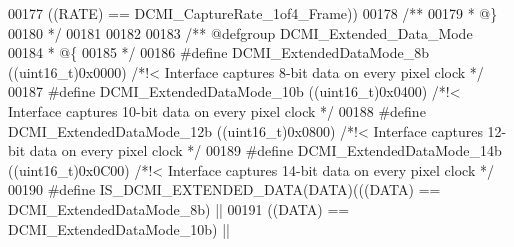 \begin{DoxyCode}
00177                                     \textcolor{preprocessor}{(}\textcolor{preprocessor}{(}\textcolor{preprocessor}{RATE}\textcolor{preprocessor}{)} \textcolor{preprocessor}{==} DCMI_CaptureRate_1of4_Frame\textcolor{preprocessor}{)}\textcolor{preprocessor}{)}
00178 \textcolor{comment}{/**}
00179 \textcolor{comment}{  * @\}}
00180 \textcolor{comment}{  */}
00181 
00182 
00183 \textcolor{comment}{/** @defgroup DCMI\_Extended\_Data\_Mode }
00184 \textcolor{comment}{  * @\{}
00185 \textcolor{comment}{  */}
00186 \textcolor{preprocessor}{#}\textcolor{preprocessor}{define} \textcolor{preprocessor}{DCMI\_ExtendedDataMode\_8b}     \textcolor{preprocessor}{(}\textcolor{preprocessor}{(}\textcolor{preprocessor}{uint16\_t}\textcolor{preprocessor}{)}0x0000\textcolor{preprocessor}{)} \textcolor{comment}{/*!< Interface captures 8-bit data on every
       pixel clock */}
00187 \textcolor{preprocessor}{#}\textcolor{preprocessor}{define} \textcolor{preprocessor}{DCMI\_ExtendedDataMode\_10b}    \textcolor{preprocessor}{(}\textcolor{preprocessor}{(}\textcolor{preprocessor}{uint16\_t}\textcolor{preprocessor}{)}0x0400\textcolor{preprocessor}{)} \textcolor{comment}{/*!< Interface captures 10-bit data on every
       pixel clock */}
00188 \textcolor{preprocessor}{#}\textcolor{preprocessor}{define} \textcolor{preprocessor}{DCMI\_ExtendedDataMode\_12b}    \textcolor{preprocessor}{(}\textcolor{preprocessor}{(}\textcolor{preprocessor}{uint16\_t}\textcolor{preprocessor}{)}0x0800\textcolor{preprocessor}{)} \textcolor{comment}{/*!< Interface captures 12-bit data on every
       pixel clock */}
00189 \textcolor{preprocessor}{#}\textcolor{preprocessor}{define} \textcolor{preprocessor}{DCMI\_ExtendedDataMode\_14b}    \textcolor{preprocessor}{(}\textcolor{preprocessor}{(}\textcolor{preprocessor}{uint16\_t}\textcolor{preprocessor}{)}0x0C00\textcolor{preprocessor}{)} \textcolor{comment}{/*!< Interface captures 14-bit data on every
       pixel clock */}
00190 \textcolor{preprocessor}{#}\textcolor{preprocessor}{define} \textcolor{preprocessor}{IS\_DCMI\_EXTENDED\_DATA}\textcolor{preprocessor}{(}\textcolor{preprocessor}{DATA}\textcolor{preprocessor}{)}\textcolor{preprocessor}{(}\textcolor{preprocessor}{(}\textcolor{preprocessor}{(}\textcolor{preprocessor}{DATA}\textcolor{preprocessor}{)} \textcolor{preprocessor}{==} DCMI_ExtendedDataMode_8b\textcolor{preprocessor}{)} \textcolor{preprocessor}{||}
00191                                     \textcolor{preprocessor}{(}\textcolor{preprocessor}{(}\textcolor{preprocessor}{DATA}\textcolor{preprocessor}{)} \textcolor{preprocessor}{==} DCMI_ExtendedDataMode_10b\textcolor{preprocessor}{)} \textcolor{preprocessor}{||}

\end{DoxyCode}

